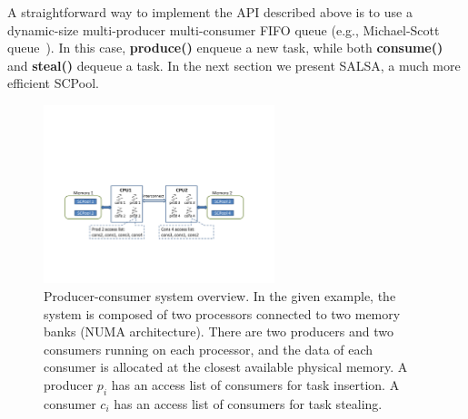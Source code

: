 A straightforward way to implement the API described above is to use a dynamic-size multi-producer multi-consumer FIFO queue (e.g., Michael-Scott queue~\cite{Michael:1996:SFP:248052.248106}).
In this case, {\bf produce()} enqueue a new task, while both {\bf consume()} and {\bf steal()} dequeue a task. In the next section we present SALSA, a much more efficient SCPool.


\begin{figure}[htb]
	\centering
	\includegraphics[width=0.6\textwidth]{figures/system-fig}
	\caption{\footnotesize{Producer-consumer system overview. In the given example, the system is composed of two processors connected to two memory banks (NUMA architecture). There are two producers and two consumers running on each processor, and the data of each consumer is allocated at the closest available physical memory. A producer $p_i$ has an access list of consumers for task insertion. A consumer $c_i$ has an access list of consumers for task stealing. }}
	\label{fig:system-fig}
\end{figure}

